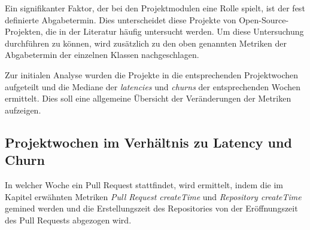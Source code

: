 Ein signifikanter Faktor, der bei den Projektmodulen eine Rolle spielt, ist der fest definierte Abgabetermin. Dies unterscheidet diese Projekte von Open-Source-Projekten, die in der Literatur häufig untersucht werden. Um diese Untersuchung durchführen zu können, wird zusätzlich zu den oben genannten Metriken der Abgabetermin der einzelnen Klassen nachgeschlagen.

Zur initialen Analyse wurden die Projekte in die entsprechenden Projektwochen aufgeteilt und die Mediane der \textit{latencies} und \textit{churns} der entsprechenden Wochen ermittelt. Dies soll eine allgemeine Übersicht der Veränderungen der Metriken aufzeigen.

\subsection{Projektwochen im Verhältnis zu Latency und Churn}
\label{sec:ProjektwochenLatencyChurn}
In welcher Woche ein Pull Request stattfindet, wird ermittelt, indem die im Kapitel  erwähnten Metriken \textit{Pull Request createTime} und \textit{Repository createTime} gemined werden und die Erstellungszeit des Repositories von der Eröffnungszeit des Pull Requests abgezogen wird. 


